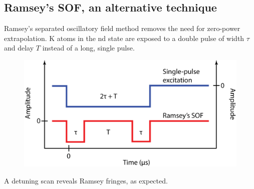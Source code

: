 \documentclass[landscape]{sciposter}
\begin{document}
\begin{multicols}{4}
\section*{\large Ramsey's SOF, an alternative technique}
Ramsey's separated oscillatory field method removes the need for zero-power extrapolation. K atoms in the nd state are exposed to a double pulse of width $\tau$ and delay $T$ instead of a long, single pulse. 

\begin{figure}
\begin{center}
\includegraphics[scale=1]{Ramsey_excitation.png}
\caption{}
\label{excitation scheme}
\end{center}
\end{figure}

A detuning scan reveals Ramsey fringes, as expected.


\end{multicols}
\end{document}
